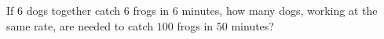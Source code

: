 If $6$ dogs together catch $6$ frogs in $6$ minutes, how many dogs, working at the same rate, are needed to catch $100$ frogs in $50$ minutes?
